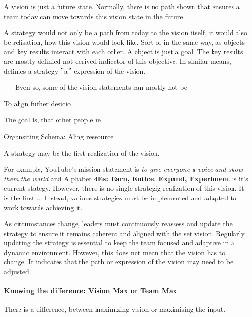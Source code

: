 A vision is just a future state. Normally, there is no path shown that ensures a team today can move towards this vision state in the future. 

A strategy would not only be a path from today to the vision itself, it would also be relisation, how this vision would look like. Sort of in the same way, as objects and key results interact with each other. A object is just a goal. The key results are mostly definied not derived indicator of this objective. In similar means, definies a strategy $"$a$"$ expression of the vision.

----
Even so, some of the vision statements can mostly not be 

To align futher desicio




The goal is, that other people re

Organsiting Schema: Aling ressource

A strategy may be the first realization of the vision.


For example, YouTube's mission statement is \textit{to give everyone a voice and show them the world} and Alphabet \textbf{4Es: Earn, Entice, Expand, Experiment} is it's current stategy. However, there is no single strategig realization of this vision. It is the first  
...
Instead, various strategies must be implemented and adapted to work towards achieving it.

As circumstances change, leaders must continuously reassess and update the strategy to ensure it remains coherent and aligned with the set vision. Regularly updating the strategy is essential to keep the team focused and adaptive in a dynamic environment. However, this does not mean that the vision has to change. It indicates that the path or expression of the vision may need to be adjusted.

\paragraph{Knowing the difference: Vision Max or Team Max}
There is a difference, between maximizing vision or maximising the input.

